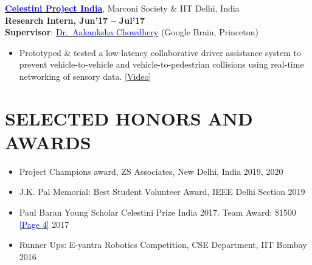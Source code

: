 \documentclass[11pt]{res} %
\begin{document}
\begin{resume}
\vspace{-0.1cm}
\href{https://www.marconisociety.org/programs-services/celestini-program/}{\textbf{\textcolor{blue}{Celestini Project India}}}, Marconi Society \& IIT Delhi, India\\
\textbf{Research Intern, Jun'17 – Jul'17}\\
\textbf{Supervisor}: \href{https://achowdhery.github.io/achowdhery-website/index.html}{\textcolor{blue}{Dr.~Aakanksha Chowdhery}} (Google Brain, Princeton)
\vspace{0.1cm}
\begin{itemize}
\item Prototyped \& tested a low-latency collaborative driver assistance system to prevent vehicle-to-vehicle and vehicle-to-pedestrian collisions using real-time networking of sensory data. \textcolor{blue}{\href{https://youtu.be/T_6gfR0uh_0}{[Video]}}
\end{itemize}


\vspace{0.1in}
\hline


\section{SELECTED HONORS AND AWARDS}

\vspace{0.2in} 

\begin{itemize}
    \item Project Champions award, ZS Associates, New Delhi, India \hfill 2019, 2020
    \item{}J.K. Pal Memorial: Best Student Volunteer Award, IEEE Delhi Section \hfill 2019
    \item Paul Baran Young Scholar Celestini Prize India 2017. Team Award: \$1500 \href{https://bhartischool.iitd.ac.in/pdf/7thISSUEnewsletter.pdf}{\textcolor{blue}{[Page 4]}} \hfill 2017
    \item Runner Ups: E-yantra Robotics Competition, CSE Department, IIT Bombay \hfill 2016
\end{itemize}

\vspace{0.1in}

\hline




\end{resume}
\end{document}
